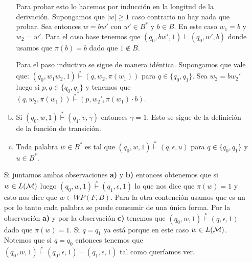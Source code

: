 \documentclass[tesis.tex]{subfiles}
\begin{document}
\begin{ej}
\begin{enumerate}[E1.]
\begin{enumerate}[a)]
			Para probar esto lo hacemos por inducción en la longitud de la derivación.
			Supongamos que $|w| \ge 1$ caso contrario no hay nada que probar.
			Sea entonces $w = bw'$ con $w' \in B^*$ y $b \in B$.
			En este caso $w_{1} = b$ y $w_{2} = w'$.
			Para el caso base tenemos que $(q_{0},bw',1) \vdash (q_{0},w',b)$ donde usamos que $\pi(b) = b$ dado que $1 \notin B$.
			
			
			Para el paso inductivo se sigue de manera idéntica.
			Supongamos que vale que: \newline			
			$(q_{0},w_{1}w_{2},1) \overset{*}{\vdash} (q, w_{2}, \pi(w_{1}))$ para $q\in \{ q_{0}, q_{1}\}$.
			Sea $w_{2}=bw_{2}'$ luego si $p,q \in \{ q_{0}, q_{1}\}$ y tenemos que $(q,w_{2},\pi(w_{1})) \overset{*}{\vdash} (p,w_{2}',\pi(w_{1}) \cdot b)$.
			
			\item Si $(q_{0},w,1) \overset{*}{\vdash} (q_{1},v,\gamma)$ entonces $\gamma = 1$.
			Esto se sigue de la definición de la función de transición.
			
			\item Toda palabra $w \in B^*$ es tal que $(q_{0},w,1) \overset{*}{\vdash} (q,\epsilon,u)$ para $q \in \{q_{0}, q_{1}\} $ y $u \in B^*$. 
		\end{enumerate}
		
		Si juntamos ambas observaciones \textbf{a)} y \textbf{b)} entonces obtenemos que si $w \in L(\cal M)$ luego \newline 
		$(q_{0},w,1) \overset{*}{\vdash} (q_{1},\epsilon,1)$ lo que nos dice que $\pi(w) = 1$ y esto nos dice que $w \in WP(F, B)$.
		Para la otra contención usamos que es un \APD por lo tanto cada palabra se puede consumir de una única forma.
		Por la observación \textbf{a)} y por la observación \textbf{c)} tenemos que $(q_{0},w,1) \overset{*}{\vdash} (q,\epsilon,1)$ dado que $\pi(w) = 1$.
		Si $q = q_{1}$ ya está porque en este caso $w \in L(\cal M)$. 
		Notemos que si $q = q_{0}$ entonces tenemos que $(q_{0},w,1) \overset{*}{\vdash} (q_{0},\epsilon,1) \vdash (q_{1},\epsilon,1)$ tal como queríamos ver.
		

\end{enumerate}
\end{ej}
\end{document}
